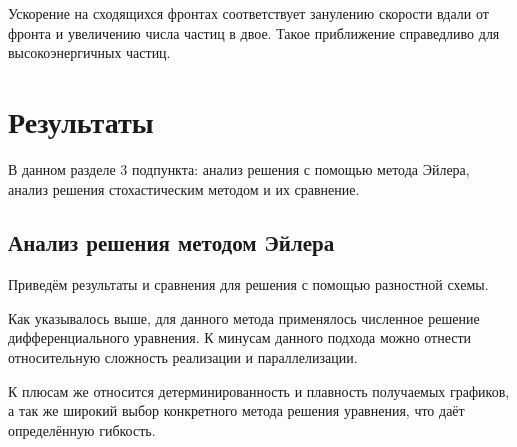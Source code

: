 \documentclass[a4paper,14pt]{extarticle} %
\begin{document}
Ускорение на сходящихся фронтах соответствует занулению скорости вдали от фронта и увеличению числа частиц в двое. Такое приближение справедливо для высокоэнергичных частиц.

\section{Результаты}
В данном разделе 3 подпункта: анализ решения с помощью метода Эйлера, анализ решения стохастическим методом и их сравнение.
\subsection{Анализ решения методом Эйлера}
Приведём результаты и сравнения для решения с помощью разностной схемы. 

Как указывалось выше, для данного метода применялось численное решение дифференциального уравнения. К минусам данного подхода можно отнести относительную сложность реализации и параллелизации. 

К плюсам же относится детерминированность и плавность получаемых графиков, а так же широкий выбор конкретного метода решения уравнения, что даёт определённую гибкость.
\end{document}
